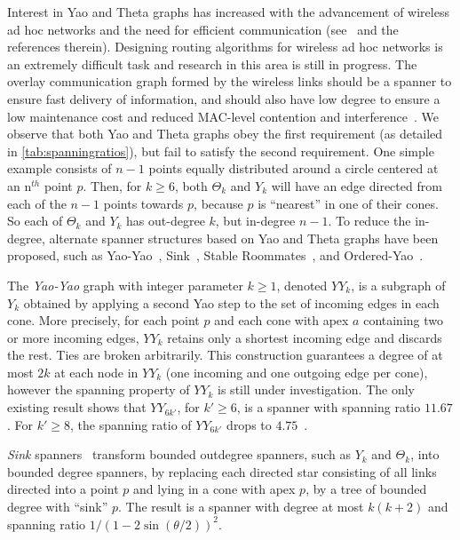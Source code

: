 \documentclass[runningheads,a4paper]{llncs}
\begin{document}
\vspace{-2em}
Interest in Yao and Theta graphs has increased with the advancement of wireless ad hoc networks and the need for efficient communication (see~\cite{RodittyMU08,Chris08,KanjPGe09,CowenLW00} and the references therein). Designing routing algorithms for wireless ad hoc networks is an extremely difficult 
task and research in this area is still in progress. The overlay communication graph formed by the wireless links should be a spanner to ensure fast delivery of information, and should also have low degree to ensure a low maintenance cost and reduced MAC-level contention and interference~\cite{HamR06}. We observe that both Yao and Theta graphs obey the first requirement (as detailed in   \autoref{tab:spanningratios}), but fail to satisfy the second requirement. One simple example consists of $n-1$ points equally distributed around a circle centered at an n$^{th}$ point $p$. Then, for $k \ge 6$, both $\Theta_k$ and $Y_k$ will have an edge directed from each of the $n-1$ points towards $p$, because $p$ is ``nearest'' in one of their cones. So each of $\Theta_k$ and $Y_k$ has out-degree $k$, but in-degree $n-1$. To reduce the in-degree, alternate spanner structures based on Yao and Theta graphs have been proposed, such as Yao-Yao~\cite{WL03}, Sink~\cite{LiWanWang01,AryaYY95}, Stable Roommates~\cite{BoseCCCKL13}, and Ordered-Yao~\cite{Song04}. 

The \emph{Yao-Yao} graph with integer parameter $k \ge 1$, denoted $YY_k$, is a subgraph of $Y_k$ obtained by applying a second Yao step to the set of incoming edges in each cone.  More precisely, for each point $p$ and each cone with apex $a$ containing two or more incoming edges, $YY_k$ retains only a shortest incoming edge and discards the rest. Ties are broken arbitrarily.  This construction guarantees a degree of at most $2k$ at each node in $YY_k$ (one incoming and one outgoing edge per cone), however the spanning property of $YY_k$ is still under investigation.  The only existing result shows that $YY_{6k'}$, for $k' \ge 6$, is a spanner with spanning ratio $11.67$. For $k' \ge 8$,  the spanning ratio of $YY_{6k'}$ drops to $4.75$~\cite{DB13}. 

\emph{Sink} spanners~\cite{LiWanWang01,AryaYY95} transform bounded outdegree spanners, such as $Y_k$ and $\Theta_k$, into bounded degree spanners, by replacing  each directed star consisting of all links directed into a point $p$ and lying in a cone with apex $p$, 
by a tree of bounded degree with ``sink'' $p$. The result is a spanner with degree at most $k(k+2)$ and spanning ratio $1/(1-2\sin(\theta/2))^2$. 
\end{document}

